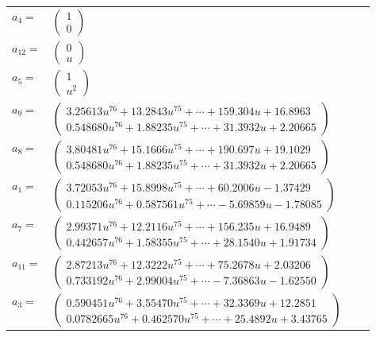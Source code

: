 \documentclass[1p]{elsarticle_modified}
\theoremstyle{definition}
\begin{document}
\begin{tabular}{m{7pt} m{180pt} m{7pt} m{180pt} }
\flushright $a_{4}=$&$\begin{pmatrix}1\\0\end{pmatrix}$ \\
\flushright $a_{12}=$&$\begin{pmatrix}0\\u\end{pmatrix}$ \\
\flushright $a_{5}=$&$\begin{pmatrix}1\\u^2\end{pmatrix}$ \\
\flushright $a_{9}=$&$\begin{pmatrix}3.25613 u^{76}+13.2843 u^{75}+\cdots+159.304 u+16.8963\\0.548680 u^{76}+1.88235 u^{75}+\cdots+31.3932 u+2.20665\end{pmatrix}$ \\
\flushright $a_{8}=$&$\begin{pmatrix}3.80481 u^{76}+15.1666 u^{75}+\cdots+190.697 u+19.1029\\0.548680 u^{76}+1.88235 u^{75}+\cdots+31.3932 u+2.20665\end{pmatrix}$ \\
\flushright $a_{1}=$&$\begin{pmatrix}3.72053 u^{76}+15.8998 u^{75}+\cdots+60.2006 u-1.37429\\0.115206 u^{76}+0.587561 u^{75}+\cdots-5.69859 u-1.78085\end{pmatrix}$ \\
\flushright $a_{7}=$&$\begin{pmatrix}2.99371 u^{76}+12.2116 u^{75}+\cdots+156.235 u+16.9489\\0.442657 u^{76}+1.58355 u^{75}+\cdots+28.1540 u+1.91734\end{pmatrix}$ \\
\flushright $a_{11}=$&$\begin{pmatrix}2.87213 u^{76}+12.3222 u^{75}+\cdots+75.2678 u+2.03206\\0.733192 u^{76}+2.99004 u^{75}+\cdots-7.36863 u-1.62550\end{pmatrix}$ \\
\flushright $a_{3}=$&$\begin{pmatrix}0.590451 u^{76}+3.55470 u^{75}+\cdots+32.3369 u+12.2851\\0.0782665 u^{76}+0.462570 u^{75}+\cdots+25.4892 u+3.43765\end{pmatrix}$ \\

\end{tabular}
\end{document}
